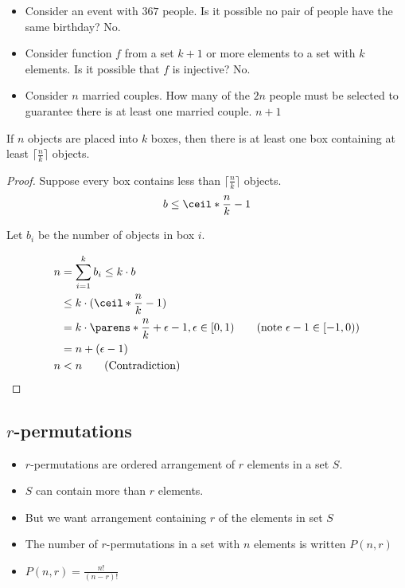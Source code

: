 \documentclass{scrreprt}
\begin{document}
\begin{example}
    \begin{itemize}
        \item Consider an event with $367$ people. Is it possible no pair of people
              have the same birthday? No.
        \item Consider function $f$ from a set $k+1$ or more elements to a set
              with $k$ elements. Is it possible that $f$ is injective? No.
        \item Consider $n$ married couples. How many of the $2n$ people
              must be selected to guarantee there is at least one married couple. $n + 1$
    \end{itemize}
\end{example}

\begin{theorem}
    If $n$ objects are placed into $k$ boxes, then there is at least one box
    containing at least $\lceil \frac{n}{k} \rceil$ objects.

    \begin{proof}
        Suppose every box contains less than $\lceil \frac{n}{k} \rceil$ objects.
        \[
            b\leq \ceil*{\frac{n}{k}} - 1
        \]

        Let $b_i$ be the number of objects in box $i$.

        \begin{align*}
            n & = \sum_{i=1}^k b_i \leq k\cdot b                                                                      \\
              & \leq k\cdot (\ceil*{\frac{n}{k}} - 1)                                                                 \\
              & = k\cdot \parens*{\frac{n}{k} + \epsilon - 1}, \epsilon \in [0, 1) \tag{note $\epsilon-1\in [-1, 0)$} \\
              & = n + (\epsilon - 1)                                                                                  \\
            n & < n \tag{Contradiction}
        \end{align*}
    \end{proof}
\end{theorem}

\subsection{$r$-permutations}

\begin{itemize}
    \item $r$-permutations are ordered arrangement of $r$ elements in a set $S$.
    \item $S$ can contain more than $r$ elements.
    \item But we want arrangement containing $r$ of the elements in set $S$
    \item The number of $r$-permutations in a set with $n$ elements is written $P(n, r)$
    \item $P(n, r) = \frac{n!}{(n-r)!}$
\end{itemize}
\end{document}
